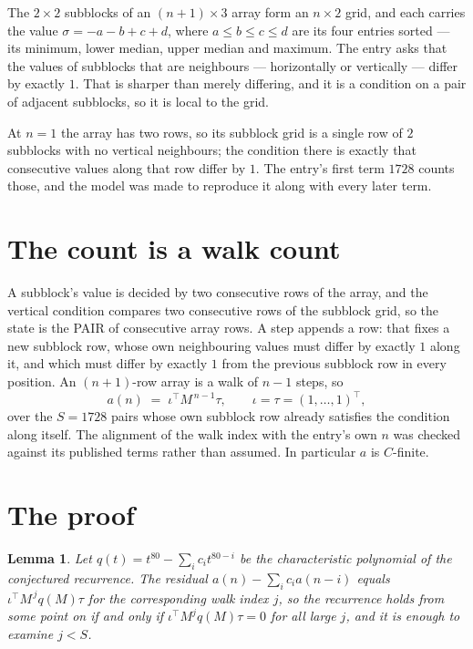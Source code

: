 \documentclass[11pt,a4paper]{article}
\theoremstyle{plain}
\newtheorem{lemma}[theorem]{Lemma}
\theoremstyle{definition}
\begin{document}
The $2\times2$ subblocks of an $(n+1)\times3$ array form an
$n\times2$ grid, and each carries the value $\sigma=-a-b+c+d$, where $a\le b\le c\le d$ are its four entries sorted --- its minimum, lower median, upper median and maximum. The entry asks that the values of
subblocks that are neighbours --- horizontally or vertically --- differ by exactly $1$.
That is sharper than merely differing, and it is a condition on a pair of adjacent subblocks,
so it is local to the grid.

At $n=1$ the array has two rows, so its subblock grid is a single row of $2$ subblocks with
no vertical neighbours; the condition there is exactly that consecutive values along that row
differ by $1$. The entry's first term $1728$ counts those, and the model was made to
reproduce it along with every later term.

\section{The count is a walk count}

A subblock's value is decided by two consecutive rows of the array, and the
vertical condition compares two consecutive rows of the subblock grid, so the state is the
PAIR of consecutive array rows. A step appends a row: that fixes a new subblock row, whose own
neighbouring values must differ by exactly $1$ along it, and which must differ by exactly
$1$ from the previous subblock row in every position. An $(n+1)$-row array is a walk of
$n-1$ steps, so
\[
a(n)\;=\;\iota^{\!\top}M^{\,n-1}\tau,\qquad\iota=\tau=(1,\dots,1)^{\!\top},
\]
over the $S=1728$ pairs whose own subblock row already satisfies the condition along itself.
The alignment of the walk index with the entry's own $n$ was checked against its published
terms rather than assumed. In particular $a$ is $C$-finite.

\section{The proof}

\begin{lemma}\label{lem:crit}
Let $q(t)=t^{80}-\sum_i c_it^{80-i}$ be the characteristic polynomial of the
conjectured recurrence. The residual $a(n)-\sum_ic_ia(n-i)$ equals
$\iota^{\!\top}M^{\,j}q(M)\tau$ for the corresponding walk index $j$, so the recurrence
holds from some point on if and only if $\iota^{\!\top}M^{j}q(M)\tau=0$ for all large $j$,
and it is enough to examine $j<S$.
\end{lemma}
\end{document}
